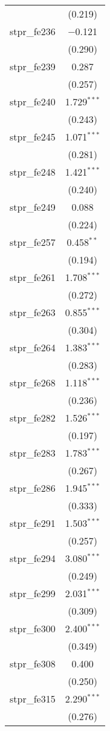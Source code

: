 \begin{table}[!htbp]
\begin{tabular}{@{\extracolsep{5pt}}lc}
  & (0.219) \\ 
  stpr\_fe236 & $-$0.121 \\ 
  & (0.290) \\ 
  stpr\_fe239 & 0.287 \\ 
  & (0.257) \\ 
  stpr\_fe240 & 1.729$^{***}$ \\ 
  & (0.243) \\ 
  stpr\_fe245 & 1.071$^{***}$ \\ 
  & (0.281) \\ 
  stpr\_fe248 & 1.421$^{***}$ \\ 
  & (0.240) \\ 
  stpr\_fe249 & 0.088 \\ 
  & (0.224) \\ 
  stpr\_fe257 & 0.458$^{**}$ \\ 
  & (0.194) \\ 
  stpr\_fe261 & 1.708$^{***}$ \\ 
  & (0.272) \\ 
  stpr\_fe263 & 0.855$^{***}$ \\ 
  & (0.304) \\ 
  stpr\_fe264 & 1.383$^{***}$ \\ 
  & (0.283) \\ 
  stpr\_fe268 & 1.118$^{***}$ \\ 
  & (0.236) \\ 
  stpr\_fe282 & 1.526$^{***}$ \\ 
  & (0.197) \\ 
  stpr\_fe283 & 1.783$^{***}$ \\ 
  & (0.267) \\ 
  stpr\_fe286 & 1.945$^{***}$ \\ 
  & (0.333) \\ 
  stpr\_fe291 & 1.503$^{***}$ \\ 
  & (0.257) \\ 
  stpr\_fe294 & 3.080$^{***}$ \\ 
  & (0.249) \\ 
  stpr\_fe299 & 2.031$^{***}$ \\ 
  & (0.309) \\ 
  stpr\_fe300 & 2.400$^{***}$ \\ 
  & (0.349) \\ 
  stpr\_fe308 & 0.400 \\ 
  & (0.250) \\ 
  stpr\_fe315 & 2.290$^{***}$ \\ 
  & (0.276) \\ 

\end{tabular}
\end{table}
